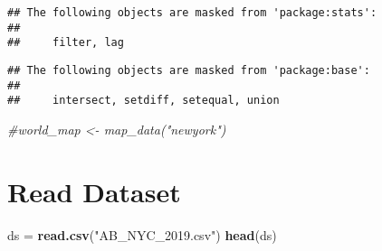 \documentclass[
]{article}
\newenvironment{Shaded}{\begin{snugshade}}{\end{snugshade}}
\newcommand{\CommentTok}[1]{\textcolor[rgb]{0.56,0.35,0.01}{\textit{#1}}}
\newcommand{\KeywordTok}[1]{\textcolor[rgb]{0.13,0.29,0.53}{\textbf{#1}}}
\newcommand{\NormalTok}[1]{#1}
\newcommand{\StringTok}[1]{\textcolor[rgb]{0.31,0.60,0.02}{#1}}
\begin{document}
\begin{verbatim}
## The following objects are masked from 'package:stats':
## 
##     filter, lag
\end{verbatim}

\begin{verbatim}
## The following objects are masked from 'package:base':
## 
##     intersect, setdiff, setequal, union
\end{verbatim}

\begin{Shaded}
\begin{Highlighting}[]
\CommentTok{#world_map <- map_data("newyork")}
\end{Highlighting}
\end{Shaded}

\hypertarget{read-dataset}{%
\section{Read Dataset}\label{read-dataset}}

\begin{Shaded}
\begin{Highlighting}[]
\NormalTok{ds =}\StringTok{ }\KeywordTok{read.csv}\NormalTok{(}\StringTok{"AB_NYC_2019.csv"}\NormalTok{)}
\KeywordTok{head}\NormalTok{(ds)}
\end{Highlighting}
\end{Shaded}
\end{document}
